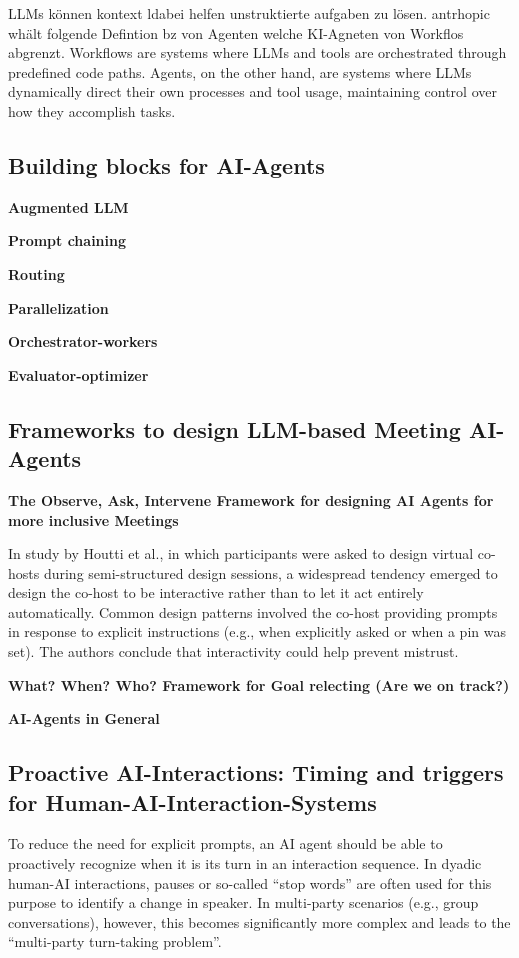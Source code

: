 LLMs können kontext ldabei helfen unstruktierte aufgaben zu lösen. antrhopic whält folgende Defintion bz von
Agenten welche KI-Agneten von Workflos abgrenzt.
Workflows are systems where LLMs and tools are orchestrated through predefined code paths.
Agents, on the other hand, are systems where LLMs dynamically direct their own processes and tool usage,
maintaining control over how they accomplish tasks.

\subsection{Building blocks for AI-Agents}

\textbf{Augmented LLM}

\textbf{Prompt chaining}

\textbf{Routing}

\textbf{Parallelization}

\textbf{Orchestrator-workers}

\textbf{Evaluator-optimizer}

\subsection{Frameworks to design LLM-based Meeting AI-Agents}

\textbf{The Observe, Ask, Intervene Framework for designing AI Agents for more inclusive Meetings}

In study by Houtti et al.\cite[p. 5]{houttiObserveAskIntervene2025},
in which participants were asked to design virtual co-hosts during semi-structured design sessions,
a widespread tendency emerged to design the co-host to be interactive rather than to let it act entirely
automatically.
Common design patterns involved the co-host providing prompts in response to explicit instructions (e.g.,
when explicitly asked or when a pin was set).
The authors conclude that interactivity could help prevent mistrust.

\textbf{What? When? Who? Framework for Goal relecting (Are we on track?)}

\textbf{AI-Agents in General}

\subsection{Proactive AI-Interactions: Timing and triggers for Human-AI-Interaction-Systems}

To reduce the need for explicit prompts, an AI agent should be able to proactively recognize when it is its
turn in an interaction sequence. In dyadic human-AI interactions, pauses or so-called “stop words” are often
used for this purpose to identify a change in speaker. In multi-party scenarios (e.g., group conversations),
however, this becomes significantly more complex and leads to the “multi-party turn-taking
problem”. \cite{sacksSimplestSystematicsOrganization1974}

